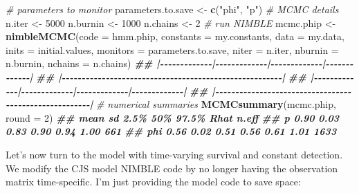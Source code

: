 \documentclass[
  12pt,
]{krantz}
\newenvironment{Shaded}{\begin{snugshade}}{\end{snugshade}}
\newcommand{\AttributeTok}[1]{\textcolor[rgb]{0.13,0.29,0.53}{#1}}
\newcommand{\CommentTok}[1]{\textcolor[rgb]{0.56,0.35,0.01}{\textit{#1}}}
\newcommand{\DecValTok}[1]{\textcolor[rgb]{0.00,0.00,0.81}{#1}}
\newcommand{\DocumentationTok}[1]{\textcolor[rgb]{0.56,0.35,0.01}{\textbf{\textit{#1}}}}
\newcommand{\FunctionTok}[1]{\textcolor[rgb]{0.13,0.29,0.53}{\textbf{#1}}}
\newcommand{\NormalTok}[1]{#1}
\newcommand{\OtherTok}[1]{\textcolor[rgb]{0.56,0.35,0.01}{#1}}
\newcommand{\StringTok}[1]{\textcolor[rgb]{0.31,0.60,0.02}{#1}}
\begin{document}
\begin{Shaded}
\begin{Highlighting}[]
\CommentTok{\# parameters to monitor}
\NormalTok{parameters.to.save }\OtherTok{\textless{}{-}} \FunctionTok{c}\NormalTok{(}\StringTok{"phi"}\NormalTok{, }\StringTok{"p"}\NormalTok{)}
\CommentTok{\# MCMC details}
\NormalTok{n.iter }\OtherTok{\textless{}{-}} \DecValTok{5000}
\NormalTok{n.burnin }\OtherTok{\textless{}{-}} \DecValTok{1000}
\NormalTok{n.chains }\OtherTok{\textless{}{-}} \DecValTok{2}
\CommentTok{\# run NIMBLE}
\NormalTok{mcmc.phip }\OtherTok{\textless{}{-}} \FunctionTok{nimbleMCMC}\NormalTok{(}\AttributeTok{code =}\NormalTok{ hmm.phip, }
                        \AttributeTok{constants =}\NormalTok{ my.constants,}
                        \AttributeTok{data =}\NormalTok{ my.data,              }
                        \AttributeTok{inits =}\NormalTok{ initial.values,}
                        \AttributeTok{monitors =}\NormalTok{ parameters.to.save,}
                        \AttributeTok{niter =}\NormalTok{ n.iter,}
                        \AttributeTok{nburnin =}\NormalTok{ n.burnin, }
                        \AttributeTok{nchains =}\NormalTok{ n.chains)}
\DocumentationTok{\#\# |{-}{-}{-}{-}{-}{-}{-}{-}{-}{-}{-}{-}{-}|{-}{-}{-}{-}{-}{-}{-}{-}{-}{-}{-}{-}{-}|{-}{-}{-}{-}{-}{-}{-}{-}{-}{-}{-}{-}{-}|{-}{-}{-}{-}{-}{-}{-}{-}{-}{-}{-}{-}{-}|}
\DocumentationTok{\#\# |{-}{-}{-}{-}{-}{-}{-}{-}{-}{-}{-}{-}{-}{-}{-}{-}{-}{-}{-}{-}{-}{-}{-}{-}{-}{-}{-}{-}{-}{-}{-}{-}{-}{-}{-}{-}{-}{-}{-}{-}{-}{-}{-}{-}{-}{-}{-}{-}{-}{-}{-}{-}{-}{-}{-}|}
\DocumentationTok{\#\# |{-}{-}{-}{-}{-}{-}{-}{-}{-}{-}{-}{-}{-}|{-}{-}{-}{-}{-}{-}{-}{-}{-}{-}{-}{-}{-}|{-}{-}{-}{-}{-}{-}{-}{-}{-}{-}{-}{-}{-}|{-}{-}{-}{-}{-}{-}{-}{-}{-}{-}{-}{-}{-}|}
\DocumentationTok{\#\# |{-}{-}{-}{-}{-}{-}{-}{-}{-}{-}{-}{-}{-}{-}{-}{-}{-}{-}{-}{-}{-}{-}{-}{-}{-}{-}{-}{-}{-}{-}{-}{-}{-}{-}{-}{-}{-}{-}{-}{-}{-}{-}{-}{-}{-}{-}{-}{-}{-}{-}{-}{-}{-}{-}{-}|}
\CommentTok{\# numerical summaries}
\FunctionTok{MCMCsummary}\NormalTok{(mcmc.phip, }\AttributeTok{round =} \DecValTok{2}\NormalTok{)}
\DocumentationTok{\#\#     mean   sd 2.5\%  50\% 97.5\% Rhat n.eff}
\DocumentationTok{\#\# p   0.90 0.03 0.83 0.90  0.94 1.00   661}
\DocumentationTok{\#\# phi 0.56 0.02 0.51 0.56  0.61 1.01  1633}
\end{Highlighting}
\end{Shaded}

Let's now turn to the model with time-varying survival and constant detection. We modify the CJS model NIMBLE code by no longer having the observation matrix time-specific. I'm just providing the model code to save space:
\end{document}
